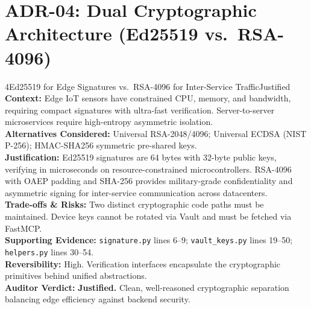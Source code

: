\documentclass[10pt,a4paper]{report}
\begin{document}
\section{ADR-04: Dual Cryptographic Architecture (Ed25519 vs.\ RSA-4096)}
\begin{adrbox}{4}{Ed25519 for Edge Signatures vs.\ RSA-4096 for Inter-Service Traffic}{Justified}
\textbf{Context:} Edge IoT sensors have constrained CPU, memory, and bandwidth, requiring compact signatures with ultra-fast verification. Server-to-server microservices require high-entropy asymmetric isolation.\\
\textbf{Alternatives Considered:} Universal RSA-2048/4096; Universal ECDSA (NIST P-256); HMAC-SHA256 symmetric pre-shared keys.\\
\textbf{Justification:} Ed25519 signatures are 64 bytes with 32-byte public keys, verifying in microseconds on resource-constrained microcontrollers. RSA-4096 with OAEP padding and SHA-256 provides military-grade confidentiality and asymmetric signing for inter-service communication across datacenters.\\
\textbf{Trade-offs \& Risks:} Two distinct cryptographic code paths must be maintained. Device keys cannot be rotated via Vault and must be fetched via FastMCP.\\
\textbf{Supporting Evidence:} \texttt{signature.py} lines 6--9; \texttt{vault\_keys.py} lines 19--50; \texttt{helpers.py} lines 30--54.\\
\textbf{Reversibility:} High. Verification interfaces encapsulate the cryptographic primitives behind unified abstractions.\\
\textbf{Auditor Verdict:} \textbf{Justified.} Clean, well-reasoned cryptographic separation balancing edge efficiency against backend security.
\end{adrbox}
\end{document}
